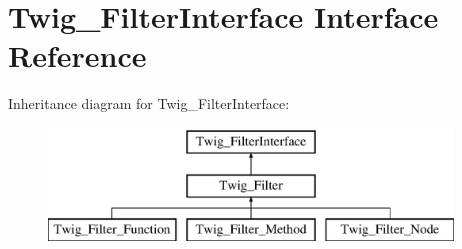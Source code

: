 \hypertarget{interface_twig___filter_interface}{}\section{Twig\+\_\+\+Filter\+Interface Interface Reference}
\label{interface_twig___filter_interface}
Inheritance diagram for Twig\+\_\+\+Filter\+Interface\+:\begin{figure}[H]
\begin{center}
\leavevmode
\includegraphics[height=3.000000cm]{interface_twig___filter_interface}
\end{center}
\end{figure}
